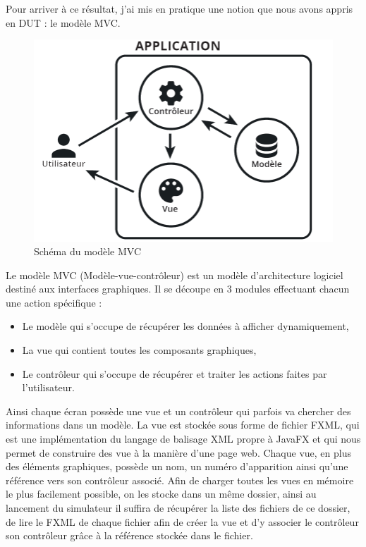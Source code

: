 Pour arriver à ce résultat, j'ai mis en pratique une notion que nous avons appris en DUT : le modèle MVC.
\begin{figure}[h]
	\begin{center}
		\includegraphics[scale=0.70]{partie2/images/mvc.png}
		\caption{Schéma du modèle MVC}
	\end{center}
\end{figure}

Le modèle MVC (Modèle-vue-contrôleur) est un modèle d'architecture logiciel destiné aux interfaces graphiques. Il se découpe en 3 modules effectuant chacun une action spécifique :
\begin{itemize}
	\item Le modèle qui s'occupe de récupérer les données à afficher dynamiquement,
	\item La vue qui contient toutes les composants graphiques,
	\item Le contrôleur qui s'occupe de récupérer et traiter les actions faites par l'utilisateur.\\
\end{itemize}

Ainsi chaque écran possède une vue et un contrôleur qui parfois va chercher des informations dans un modèle. La vue est stockée sous forme de fichier FXML, qui est une implémentation du langage de balisage XML propre à JavaFX et qui nous permet de construire des vue à la manière d'une page web. Chaque vue, en plus des éléments graphiques, possède un nom, un numéro d'apparition ainsi qu'une référence vers son contrôleur associé.
Afin de charger toutes les vues en mémoire le plus facilement possible, on les stocke dans un même dossier, ainsi au lancement du simulateur il suffira de récupérer la liste des fichiers de ce dossier, de lire le FXML de chaque fichier afin de créer la vue et d'y associer le contrôleur son contrôleur grâce à la référence stockée dans le fichier.

